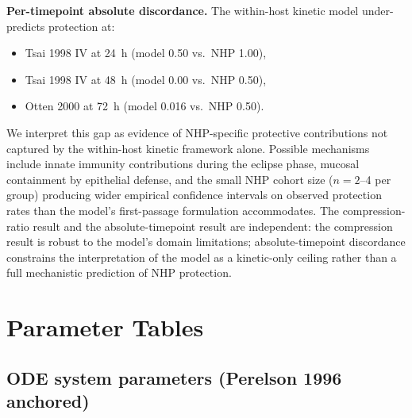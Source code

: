 \documentclass[11pt]{article}
\theoremstyle{definition}
\theoremstyle{remark}
\begin{document}
\textbf{Per-timepoint absolute discordance.} The within-host kinetic model under-predicts protection at:
\begin{itemize}[nosep,leftmargin=2em]
    \item Tsai 1998 IV at 24~h (model 0.50 vs.\ NHP 1.00),
    \item Tsai 1998 IV at 48~h (model 0.00 vs.\ NHP 0.50),
    \item Otten 2000 at 72~h (model 0.016 vs.\ NHP 0.50).
\end{itemize}
We interpret this gap as evidence of NHP-specific protective contributions not captured by the within-host kinetic framework alone. Possible mechanisms include innate immunity contributions during the eclipse phase, mucosal containment by epithelial defense, and the small NHP cohort size ($n = 2$--4 per group) producing wider empirical confidence intervals on observed protection rates than the model's first-passage formulation accommodates. The compression-ratio result and the absolute-timepoint result are independent: the compression result is robust to the model's domain limitations; absolute-timepoint discordance constrains the interpretation of the model as a kinetic-only ceiling rather than a full mechanistic prediction of NHP protection.

\section{Parameter Tables}

\subsection{ODE system parameters (Perelson 1996 anchored)}
\end{document}
